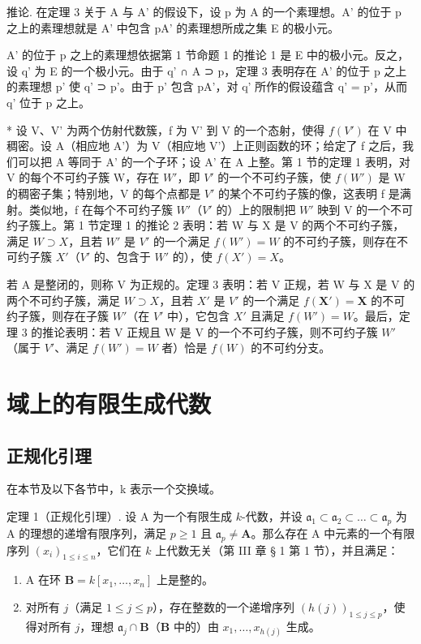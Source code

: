 推论. 在定理 3 关于 A 与 A' 的假设下，设 p 为 A 的一个素理想。A' 的位于 p 之上的素理想就是 A' 中包含 pA' 的素理想所成之集 E 的极小元。

A' 的位于 p 之上的素理想依据第 1 节命题 1 的推论 1 是 E 中的极小元。反之，设 q' 为 E 的一个极小元。由于 q' ∩ A ⊃ p，定理 3 表明存在 A' 的位于 p 之上的素理想 p' 使 q' ⊃ p'。由于 p' 包含 pA'，对 q' 所作的假设蕴含 q' = p'，从而 q' 位于 p 之上。

* 设 V、V' 为两个仿射代数簇，f 为 V' 到 V 的一个态射，使得 \(f(V')\) 在 V 中稠密。设 A（相应地 A'）为 V（相应地 V'）上正则函数的环；给定了 f 之后，我们可以把 A 等同于 A' 的一个子环；设 A' 在 A 上整。第 1 节的定理 1 表明，对 V 的每个不可约子簇 W，存在 \(W'\)，即 \(V'\) 的一个不可约子簇，使 \(f(W')\) 是 W 的稠密子集；特别地，V 的每个点都是 \(V'\) 的某个不可约子簇的像，这表明 f 是满射。类似地，f 在每个不可约子簇 \(W'\)（\(V'\) 的）上的限制把 \(W'\) 映到 V 的一个不可约子簇上。第 1 节定理 1 的推论 2 表明：若 W 与 X 是 V 的两个不可约子簇，满足 \(W \supset X\)，且若 \(W'\) 是 \(V'\) 的一个满足 \(f(W') = W\) 的不可约子簇，则存在不可约子簇 \(X'\)（\(V'\) 的、包含于 \(W'\) 的），使 \(f(X') = X\)。

若 A 是整闭的，则称 V 为正规的。定理 3 表明：若 V 正规，若 W 与 X 是 V 的两个不可约子簇，满足 \(W \supset X\)，且若 \(X'\) 是 \(V'\) 的一个满足 \(f(\mathbf{X}') = \mathbf{X}\) 的不可约子簇，则存在子簇 \(W'\)（在 \(V'\) 中），它包含 \(X'\) 且满足 \(f(W') = W\)。最后，定理 3 的推论表明：若 V 正规且 W 是 V 的一个不可约子簇，则不可约子簇 \(W'\)（属于 \(V'\)、满足 \(f(W') = W\) 者）恰是 \(f(W)\) 的不可约分支。

\section{域上的有限生成代数}

\subsection{正规化引理}

在本节及以下各节中，k 表示一个交换域。

定理 1（正规化引理）. 设 A 为一个有限生成 \(k\)-代数，并设 \(\mathfrak{a}_1 \subset \mathfrak{a}_2 \subset \ldots \subset \mathfrak{a}_p\) 为 A 的理想的递增有限序列，满足 \(p \geqslant 1\) 且 \(\mathfrak{a}_p \neq \mathbf{A}\)。那么存在 A 中元素的一个有限序列 \((x_i)_{1 \leqslant i \leqslant n}\)，它们在 \(k\) 上代数无关（第 III 章 § 1 第 1 节），并且满足：

\begin{enumerate}
\def\labelenumi{(\alph{enumi})}
\item
  A 在环 \(\mathbf{B} = k[x_1, \ldots, x_n]\) 上是整的。
\item
  对所有 \(j\)（满足 \(1 \leqslant j \leqslant p\)），存在整数的一个递增序列 \((h(j))_{1 \leqslant j \leqslant p}\)，使得对所有 \(j\)，理想 \(\mathfrak{a}_j \cap \mathbf{B}\)（\(\mathbf{B}\) 中的）由 \(x_1, \ldots, x_{h(j)}\) 生成。
\end{enumerate}

